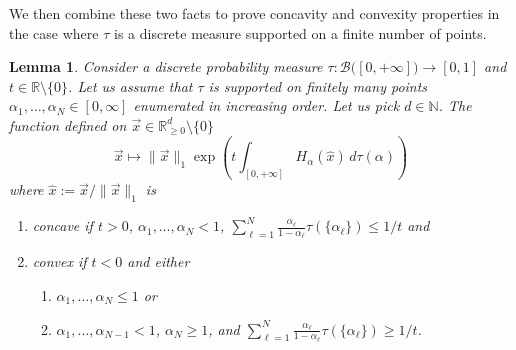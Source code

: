 \documentclass[aps,pra,11pt,onecolumn,nofootinbib,tightenlines]{revtex4-2}
\newtheorem{lemma}[theorem]{Lemma}
\theoremstyle{definition}
\newcommand{\R}{\mathbb{R}}
\newcommand{\mc}[1]{\mathcal{#1}}
\begin{document}
We then combine these two facts to prove concavity and convexity properties in the case where $\tau$ is a discrete measure supported on a finite number of points.
\begin{lemma}\label{lem: discrete measure}
Consider a discrete probability measure $\tau:\mc B\big([0,+\infty]\big)\to[0,1]$ and $t\in\R\setminus\{0\}$. Let us assume that $\tau$ is supported on finitely many points $\alpha_1,\ldots,\alpha_N\in[0,\infty]$ enumerated in increasing order. Let us pick $d\in\mathbb{N}$. The function defined on  $\vec{x}\in\R^d_{\geq 0} \setminus\{0\}$
\begin{equation}
\vec{x}\mapsto \|\vec{x}\|_1\exp{\left(t\int_{[0,+\infty]}H_\alpha(\hat{x})\,d\tau(\alpha)\right)}
\end{equation}
where $\hat{x}:=\vec{x}/\|\vec{x}\|_1$ is
\begin{enumerate}
\item concave if $t>0$, $\alpha_1,\ldots,\alpha_N<1$, $\sum_{\ell=1}^N\frac{\alpha_\ell}{1-\alpha_\ell}\tau(\{\alpha_\ell\})\leq 1/t$ and
\item convex if $t<0$ and either
\begin{enumerate}[label=(\alph*),ref=2(\alph*)]
\item $\alpha_1,\ldots,\alpha_N\leq 1$ or
\label{item: sufficient discrete convex 1}
\item $\alpha_1,\ldots,\alpha_{N-1}<1$, $\alpha_N\geq 1$, and $\sum_{\ell=1}^N\frac{\alpha_\ell}{1-\alpha_\ell}\tau(\{\alpha_\ell\})\geq1/t$.
\label{item: sufficient discrete convex 2}
\end{enumerate}
\end{enumerate}
\end{lemma}
\end{document}
